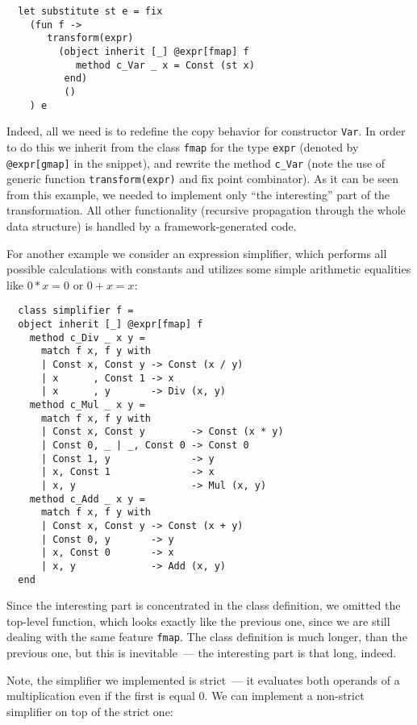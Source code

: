\documentclass[twocolumn,8pt]{extarticle}
\newcommand{\cd}[1]{\texttt{#1}}
\begin{document}
\begin{lstlisting}
  let substitute st e = fix
    (fun f ->
       transform(expr)
         (object inherit [_] @expr[fmap] f
            method c_Var _ x = Const (st x)
          end)
          ()
    ) e
\end{lstlisting}

Indeed, all we need is to redefine the copy behavior for constructor \cd{Var}. In order to do this we inherit from the class \cd{fmap} for the type
\cd{expr} (denoted by \cd{@expr[gmap]} in the snippet), and rewrite the method \cd{c\_Var} (note the use of generic function \cd{transform(expr)} and
fix point combinator). As it can be seen from this example, we needed to implement only ``the interesting'' part of the transformation. All other
functionality (recursive propagation through the whole data structure) is handled by a framework-generated code.

For another example we consider an expression simplifier, which performs all possible calculations with constants and utilizes some
simple arithmetic equalities like $0*x=0$ or $0+x=x$:

\begin{lstlisting}
  class simplifier f =
  object inherit [_] @expr[fmap] f
    method c_Div _ x y =
      match f x, f y with
      | Const x, Const y -> Const (x / y)
      | x      , Const 1 -> x
      | x      , y       -> Div (x, y)
    method c_Mul _ x y =
      match f x, f y with
      | Const x, Const y        -> Const (x * y)
      | Const 0, _ | _, Const 0 -> Const 0
      | Const 1, y              -> y
      | x, Const 1              -> x
      | x, y                    -> Mul (x, y)
    method c_Add _ x y =
      match f x, f y with
      | Const x, Const y -> Const (x + y)
      | Const 0, y       -> y
      | x, Const 0       -> x
      | x, y             -> Add (x, y)
  end
\end{lstlisting}

Since the interesting part is concentrated in the class definition, we omitted the top-level function, which looks exactly like the previous one,
since we are still dealing with the same feature \cd{fmap}. The class definition is much longer, than the previous one, but this is
inevitable~--- the interesting part is that long, indeed.

Note, the simplifier we implemented is strict~--- it evaluates both operands of a multiplication even if the first is equal 0. We can implement
a non-strict simplifier on top of the strict one:
\end{document}
